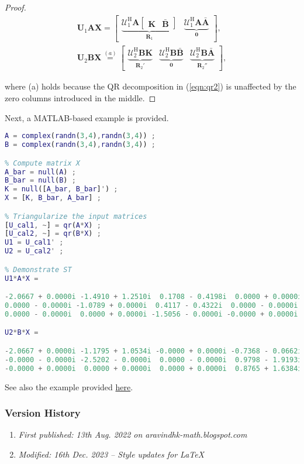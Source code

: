 \begin{proof}
\begin{align}\boldsymbol{U}_1\boldsymbol{A}\boldsymbol{X} = \begin{bmatrix}\underbrace{\boldsymbol{\mathcal{U}}_1^\mathrm{H} \boldsymbol{A} \begin{bmatrix}\boldsymbol{K} & \bar{\boldsymbol{B}}\end{bmatrix}}_{\boldsymbol{R}_1} &  \underbrace{\boldsymbol{\mathcal{U}}_1^\mathrm{H} \boldsymbol{A} \bar{\boldsymbol{A}}}_{\boldsymbol{0}}\end{bmatrix}, \\ \boldsymbol{U}_2\boldsymbol{B}\boldsymbol{X} \overset{(a)}{=} \begin{bmatrix} \underbrace{\boldsymbol{\mathcal{U}}_2^\mathrm{H} \boldsymbol{B} \boldsymbol{K}}_{\boldsymbol{R}_2'} & \underbrace{\boldsymbol{\mathcal{U}}_2^\mathrm{H} \boldsymbol{B} \bar{\boldsymbol{B}}}_{\boldsymbol{0}} &  \underbrace{\boldsymbol{\mathcal{U}}_2^\mathrm{H} \boldsymbol{B} \bar{\boldsymbol{A}}}_{\boldsymbol{R}_2''}\end{bmatrix},\end{align}

where (a) holds because the QR decomposition in (\ref{eqn:qr2}) is unaffected by the zero columns introduced in the middle.
\end{proof}

Next, a MATLAB-based example is provided.

\begin{lstlisting}[language=MATLAB,numbers=none]
% Generate compatible matrices
A = complex(randn(3,4),randn(3,4)) ;
B = complex(randn(3,4),randn(3,4)) ;

% Compute matrix X
A_bar = null(A) ;
B_bar = null(B) ;
K = null([A_bar, B_bar]') ;
X = [K, B_bar, A_bar] ;

% Triangularize the input matrices
[U_cal1, ~] = qr(A*X) ;
[U_cal2, ~] = qr(B*X) ;
U1 = U_cal1' ;
U2 = U_cal2' ;

% Demonstrate ST
U1*A*X =

-2.0667 + 0.0000i -1.4910 + 1.2510i  0.1708 - 0.4198i  0.0000 + 0.0000i
0.0000 - 0.0000i -1.0789 + 0.0000i  0.4117 - 0.4322i  0.0000 - 0.0000i
0.0000 - 0.0000i  0.0000 + 0.0000i -1.5056 - 0.0000i -0.0000 + 0.0000i

U2*B*X =

-2.0667 + 0.0000i -1.1795 + 1.0534i -0.0000 + 0.0000i -0.7368 - 0.0662i
-0.0000 - 0.0000i -2.5202 - 0.0000i  0.0000 - 0.0000i  0.9798 - 1.9193i
-0.0000 + 0.0000i  0.0000 + 0.0000i  0.0000 + 0.0000i  0.8765 + 1.6384i
\end{lstlisting}

See also the example provided \href{https://gitlab.com/aravindh.krishnamoorthy/mimo-noma}{here}.

\subsubsection{Version History}
\begin{enumerate}
	\item \emph{First published: 13th Aug. 2022 on aravindhk-math.blogspot.com}
	\item \emph{Modified: 16th Dec. 2023 -- Style updates for \LaTeX}
\end{enumerate}
